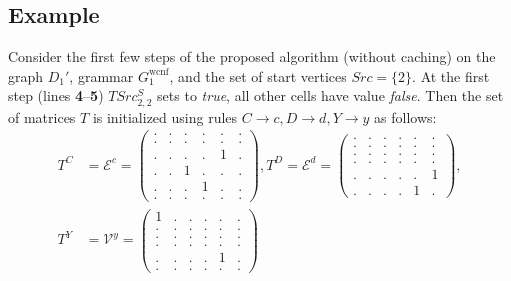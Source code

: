 \subsection{Example}

Consider the first few steps of the proposed algorithm (without caching) on the graph $D_1'$, grammar $G_1^{\text{wcnf}}$, and the set of start vertices $Src = \{2\}$.
At the first step (lines \textbf{4}--\textbf{5}) $TSrc^S_{2,2}$ sets to \textit{true}, all other cells have value \textit{false}.
Then the set of matrices $T$ is initialized using rules $C \to c, D \to d, Y \to y$ as follows:
{
    \renewcommand{\arraystretch}{0.7}
    \setlength\arraycolsep{2pt}
\begin{align*}
    T^C& = \mathcal{E}^c =
    \begin{pmatrix}
    . & . & . & . & . & . \\
    . & . & . & . & . & . \\
    . & . & . & . & 1 & . \\
    . & . & 1 & . & . & . \\
    . & . & . & 1 & . & . \\
    . & . & . & . & . & .
\end{pmatrix},
    T^D = \mathcal{E}^d =
    \begin{pmatrix}
    . & . & . & . & . & . \\
    . & . & . & . & . & . \\
    . & . & . & . & . & . \\
    . & . & . & . & . & . \\
    . & . & . & . & . & 1 \\
    . & . & . & . & 1 & .
\end{pmatrix},\\
    T^Y& = \mathcal{V}^y =
    \begin{pmatrix}
    1 & . & . & . & . & . \\
    . & . & . & . & . & . \\
    . & . & . & . & . & . \\
    . & . & . & . & . & . \\
    . & . & . & . & 1 & . \\
    . & . & . & . & . & .
\end{pmatrix}
\end{align*}
}

